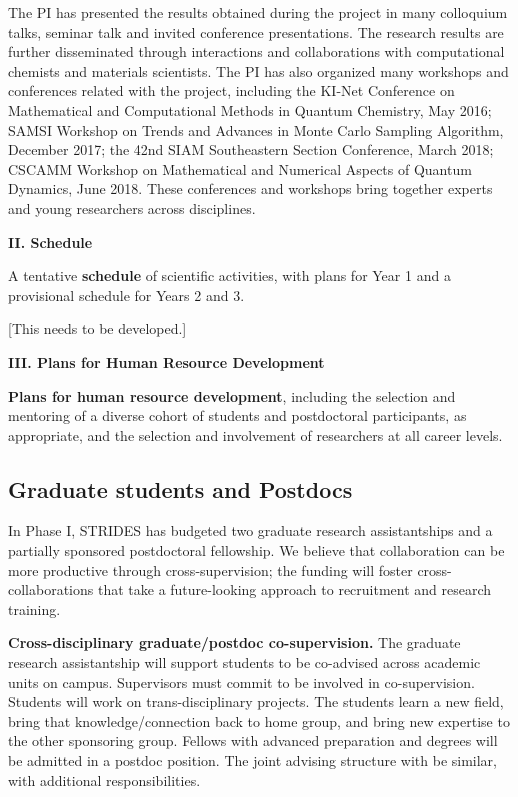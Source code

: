 \documentclass[12pt]{article}
\begin{document}
The PI has presented the results obtained during the project in many
colloquium talks, seminar talk and invited conference
presentations. The research results are further disseminated through
interactions and collaborations with computational chemists and
materials scientists. The PI has also organized many workshops and
conferences related with the project, including the KI-Net Conference
on Mathematical and Computational Methods in Quantum Chemistry, May
2016; SAMSI Workshop on Trends and Advances in Monte Carlo Sampling
Algorithm, December 2017; the 42nd SIAM Southeastern Section
Conference, March 2018; CSCAMM Workshop on Mathematical and Numerical
Aspects of Quantum Dynamics, June 2018. These conferences and
workshops bring together experts and young researchers across
disciplines.




\clearpage


\begin{center}
{\bf\large II. Schedule}
\end{center}


A tentative {\bf schedule} of scientific activities, with plans for Year 1 and a provisional schedule for Years 2 and 3.

[This needs to be developed.]

\clearpage


\begin{center}
{\bf\large III. Plans for Human Resource Development}
\end{center}


{\bf Plans for human resource development}, including the selection and mentoring of a diverse cohort of students and postdoctoral participants, as appropriate, and the selection and involvement of researchers at all career levels.


\subsection{Graduate students and Postdocs}
\label{sec:gra-postdoc}

In Phase I, STRIDES has budgeted two graduate research assistantships and a partially sponsored postdoctoral fellowship.
We believe that collaboration can be more productive through cross-supervision; the funding will foster cross-collaborations that take a future-looking approach to recruitment and research training.

\medskip
\noindent
{\bf Cross-disciplinary graduate/postdoc co-supervision.}
The graduate research assistantship will support students to be co-advised across academic units on campus.
Supervisors must commit to be involved in co-supervision.
Students will work on trans-disciplinary projects.
The students learn a new field, bring that knowledge/connection back to home group, and bring new expertise to the other sponsoring group.
Fellows with advanced preparation and degrees will be admitted in a postdoc position.
The joint advising structure with be similar, with additional responsibilities.
\end{document}
